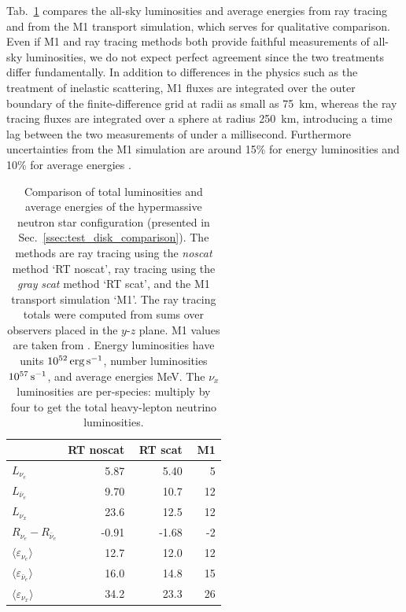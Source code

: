 \documentclass[aps,floatfix,prd,superscriptaddress,twocolumn]{revtex4-1}
\begin{document}
Tab.~\ref{tab:nsns_rt_vs_m1} compares the all-sky
luminosities and average energies from ray tracing and from
the M1 transport simulation,
which serves for qualitative comparison.
Even if M1 and ray tracing methods both provide faithful measurements
of all-sky luminosities, we do not expect perfect agreement since the two
treatments differ fundamentally. In addition to differences in the physics
such as the treatment of inelastic scattering,
M1 fluxes are integrated over the outer boundary of the finite-difference grid
at radii as small as 75~km,
whereas the ray tracing fluxes are integrated over a sphere at radius 250~km,
introducing a time lag between the two measurements of under a millisecond.
Furthermore uncertainties from the M1 simulation are around
15\% for energy luminosities and
10\% for average energies \cite[Sec.~A.6]{fouc2016-m1_evolve_n}.

\begin{table}%
  \caption{
    Comparison of total luminosities and average energies
    of the hypermassive neutron star configuration
    (presented in Sec.~\ref{ssec:test_disk_comparison}).
    The methods are ray tracing using the \emph{noscat} method `RT noscat',
    ray tracing using the \emph{gray} \emph{scat} method `RT scat',
    and the M1 transport simulation `M1'.
    The ray tracing totals were computed from sums over
    observers placed in the $y$-$z$ plane.
    M1 values are taken from \cite[Figs. 7, 9, 10]{fouc2016-m1_evolve_n}.
    Energy luminosities have units $10^{52}\,{\rm erg}\,{\rm s}^{-1}$,
    number luminosities $10^{57}\,{\rm s}^{-1}$, and
    average energies MeV.
    The $\nu_x$ luminosities are per-species:
    multiply by four to get the total heavy-lepton neutrino luminosities.
  }
  \label{tab:nsns_rt_vs_m1}
  \begin{tabularx}{\columnwidth}{X r r r}
    & {\bf RT noscat} & \,\,{\bf RT scat} & \,\,{\bf M1} \\
    \hline
    $L_{\nu_e}$                                 & 5.87 & 5.40 & 5 \\
    $L_{\bar{\nu}_e}$                           & 9.70 & 10.7 & 12 \\
    $L_{\nu_x}$                                 & 23.6 & 12.5 & 12 \\
    $R_{\nu_e}-R_{\bar{\nu}_e}$                 & -0.91 & -1.68 & -2 \\
    $\langle \varepsilon_{\nu_e} \rangle$       & 12.7 & 12.0 & 12 \\
    $\langle \varepsilon_{\bar{\nu}_e} \rangle$ & 16.0 & 14.8 & 15 \\
    $\langle \varepsilon_{\nu_x} \rangle$       & 34.2 & 23.3 & 26 \\
    \hline
  \end{tabularx}
\end{table}
\end{document}
